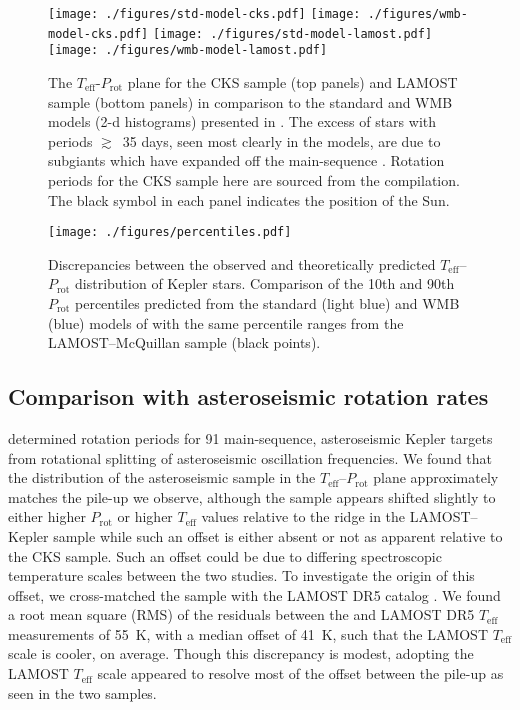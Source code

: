 \documentclass[linenumbers,tighten,trackchanges,twocolumn]{aastex631}
\newcommand{\teff}{\ensuremath{T_{\mathrm{eff}}}\xspace}
\newcommand{\prot}{\ensuremath{P_\mathrm{rot}}\xspace}
\begin{document}
\begin{figure*}
    \centering 
    \texttt{[image: ./figures/std-model-cks.pdf]}
    \texttt{[image: ./figures/wmb-model-cks.pdf]}
    \texttt{[image: ./figures/std-model-lamost.pdf]}
    \texttt{[image: ./figures/wmb-model-lamost.pdf]}
    \caption{The \teff-\prot plane for the CKS sample (top panels) and LAMOST sample (bottom panels) in comparison to the standard and WMB models (2-d histograms) presented in \citet{vanSaders2019}. The excess of stars with periods $\gtrsim$~35 days, seen most clearly in the models, are due to subgiants which have expanded off the main-sequence \citep[referred to as the long-period overdensity in][]{vanSaders2019}. Rotation periods for the CKS sample here are sourced from the \citet{David2021} compilation. The black symbol in each panel indicates the position of the Sun.}
    \label{fig:models}
\end{figure*}

\begin{figure}
    \centering
    \texttt{[image: ./figures/percentiles.pdf]}
    \caption{Discrepancies between the observed and theoretically predicted \teff--\prot distribution of Kepler stars. Comparison of the 10th and 90th \prot percentiles predicted from the standard (light blue) and WMB (blue) models of \citet{vanSaders2019} with the same percentile ranges from the LAMOST--McQuillan sample (black points).}
    \label{fig:percentiles}
\end{figure}

\subsection{Comparison with asteroseismic rotation rates}
\label{subsec:asteroseismic}

\citet{Hall2021} determined rotation periods for 91 main-sequence, asteroseismic Kepler targets from rotational splitting of asteroseismic oscillation frequencies. We found that the distribution of the asteroseismic sample in the \teff--\prot plane approximately matches the pile-up we observe, although the \citet{Hall2021} sample appears shifted slightly to either higher \prot or higher \teff values relative to the ridge in the LAMOST--Kepler sample while such an offset is either absent or not as apparent relative to the CKS sample. Such an offset could be due to differing spectroscopic temperature scales between the two studies. To investigate the origin of this offset, we cross-matched the \citet{Hall2021} sample with the LAMOST DR5 catalog \citep{Xiang2019}. We found a root mean square (RMS) of the residuals between the \citet{Hall2021} and LAMOST DR5 \teff measurements of 55~K, with a median offset of 41~K, such that the LAMOST \teff scale is cooler, on average. Though this discrepancy is modest, adopting the LAMOST \teff scale appeared to resolve most of the offset between the pile-up as seen in the two samples. 
\end{document}
